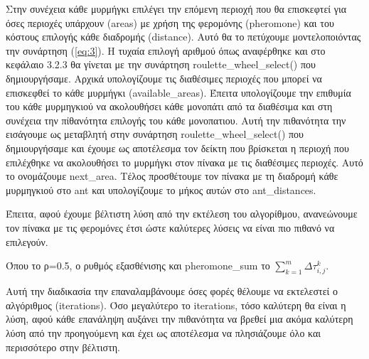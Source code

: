 Στην συνέχεια κάθε μυρμήγκι επιλέγει την επόμενη περιοχή που θα επισκεφτεί για όσες περιοχές υπάρχουν (areas) με χρήση της φερομόνης (pheromone) και του κόστους επιλογής κάθε διαδρομής (distance). Αυτό θα το πετύχουμε μοντελοποιόντας την συνάρτηση (\ref{eq:3}). Η τυχαία επιλογή αριθμού όπως αναφέρθηκε και στο κεφάλαιο 3.2.3 θα γίνεται με την συνάρτηση roulette\_wheel\_select() που δημιουργήσαμε. 
Αρχικά υπολογίζουμε τις διαθέσιμες περιοχές που μπορεί να επισκεφθεί το κάθε μυρμήγκι (available\_areas). Έπειτα υπολογίζουμε την επιθυμία του κάθε μυρμηγκιού να ακολουθήσει κάθε μονοπάτι από τα διαθέσιμα και στη συνέχεια την πίθανότητα επιλογής του κάθε μονοπατιου. Αυτή την πιθανότητα την εισάγουμε ως μεταβλητή στην συνάρτηση roulette\_wheel\_select() που δημιουργήσαμε και έχουμε ως αποτέλεσμα τον δείκτη που βρίσκεται η περιοχή που επιλέχθηκε να ακολουθήσει το μυρμήγκι στον πίνακα με τις διαθέσιμες περιοχές. Αυτό το ονομάζουμε next\_area. Τέλος προσθέτουμε τον πίνακα με τη διαδρομή κάθε μυρμηγκιού στο ant και υπολογίζουμε το μήκος αυτών στο ant\_distances. 


Έπειτα, αφού έχουμε βέλτιστη λύση από την εκτέλεση του αλγορίθμου, ανανεώνουμε τον πίνακα με τις φερομόνες έτσι ώστε καλύτερες λύσεις να είναι πιο πιθανό να επιλεγούν.

Όπου το ρ=0.5, ο ρυθμός εξασθένισης και pheromone\_sum το $\sum_{k=1}^{m}{Δτ^k_{i,j}}$. 


Αυτή την διαδικασία την επαναλαμβάνουμε όσες φορές θέλουμε να εκτελεστεί ο αλγόριθμος (iterations). Όσο μεγαλύτερο το iterations, τόσο καλύτερη θα είναι η λύση, αφού κάθε επανάληψη αυξάνει την πιθανότητα να βρεθεί μια ακόμα καλύτερη λύση από την προηγούμενη και έχει ως αποτέλεσμα να πλησιάζουμε όλο και περισσότερο στην βέλτιστη.


